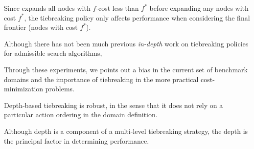 Since \astar expands all nodes with $f$-cost less than $f^*$
before expanding any nodes with cost $f^*$, the tiebreaking policy only
affects performance when considering the final frontier (nodes with cost
$f^*$).

Although there has not been much previous \emph{in-depth} work
on tiebreaking policies for admissible search algorithms, 

Through these experiments, we points out a bias in the current set of
benchmark domains and the importance of tiebreaking in
the more practical cost-minimization problems.

Depth-based tiebreaking is robust, in the sense that it does not rely on 
a particular action ordering in the domain definition.

Although depth is a component of a multi-level tiebreaking strategy, the
depth is the principal factor in determining performance.





